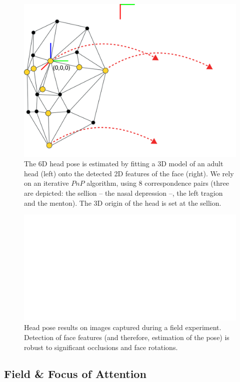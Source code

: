 \documentclass{sig-alternate}
\begin{document}
\begin{figure}[t]
    \centering
    \includegraphics[width=0.9\linewidth]{head_pose}
    \caption{The 6D head pose is estimated by fitting a 3D model of an
        adult head (left) {\it{}} onto the detected 2D features of the face (right). We
        rely on an iterative $PnP$ algorithm, using 8 correspondence pairs
        (three are depicted: the sellion -- the nasal depression --, the left
        tragion and the menton). The 3D origin of the head is set at the sellion.}
\label{head_pose}
\end{figure}

\begin{figure}[t]
    \centering
    \includegraphics[width=\linewidth]{head_pose_real_world}
    \caption{Head pose results on images captured during a field experiment.
    Detection of face features (and therefore, estimation of the pose) is robust
    to significant occlusions and face rotations.}
\label{head_pose_real_world}
\end{figure}

\subsection{Field \& Focus of Attention}
\end{document}
